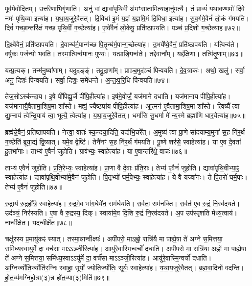 पूर्व॑मे॒वोदि॒तम्। 
उत्त॑रेणा॒भिगृ॑णाति। 
अनु॑ वां॒ द्यावा॑पृथि॒वी अ॑मꣳसाता॒मित्या॒हानु॑मत्यै। 
तं प्रा॒व्यं॑ यथा॒वण्णमो॑ दि॒वे नमः॑ पृथि॒व्या इत्या॑ह। 
य॒था॒य॒जुरे॒वैतत्। 
दि॒विधा॑ इ॒मं य॒ज्ञं य॒ज्ञमि॒मं दि॒विधा॒ इत्या॑ह। 
सु॒व॒र्गमे॒वैनं॑ लो॒कं ग॑मयति। 
दिवं॑ गच्छा॒न्तरि॑क्षं गच्छ पृथि॒वीं ग॒च्छेत्या॑ह। 
ए॒ष्वे॑वैनं॑ लो॒केषु॒ प्रति॑ष्ठापयति। 
पञ्च॑ प्र॒दिशो॑ ग॒च्छेत्या॑ह॥७२॥

दि॒क्ष्वे॑वैनं॒ प्रति॑ष्ठापयति। 
दे॒वान्घ॑र्म॒पान्ग॑च्छ पि॒तॄन्घ॑र्म॒\-पान्ग॒च्छे\-त्या॑ह। 
उ॒भये᳚ष्वे॒वैनं॒ प्रति॑ष्ठापयति। 
यत्पिन्व॑ते। 
वर्\mbox{}षु॑कः प॒र्जन्यो॑ भवति। 
तस्मा॒त्पिन्व॑मानः॒ पुण्यः॑। 
यत्प्राङ्पिन्व॑ते। 
तद्दे॒वाना᳚म्। 
यद्द॑क्षि॒णा। 
तत्पि॑तृ॒णाम्॥७३॥

यत्प्र॒त्यक्। 
तन्म॑नु॒ष्या॑णाम्। 
यदुदङ्ङ्॑। 
तद्रु॒द्राणा᳚म्। 
प्राञ्च॒मुद॑ञ्चं पिन्वयति। 
दे॒व॒त्राकः॑। 
अथो॒ खलु॑। 
सर्वा॒ अनु॒ दिशः॑ पिन्वयति। 
सर्वा॒ दिशः॒ समे॑धन्ते। 
अ॒न्तः॒प॒रि॒धि पि॑न्वयति॥७४॥

तेज॒सोऽस्क॑न्दाय। 
इ॒षे पी॑पिह्यू॒र्जे पी॑पि॒हीत्या॑ह। 
इष॑मे॒वोर्जं॒ यज॑माने दधाति। 
यज॑मानाय पीपि॒हीत्या॑ह। 
यज॑मानायै॒वैता\-मा॒शिष॒\-मा शा᳚स्ते। 
मह्यं॒ ज्यैष्ठ्या॑य पीपि॒हीत्या॑ह। 
आ॒त्मन॑ ए॒वैता\-मा॒शिष॒\-मा शा᳚स्ते। 
त्विष्यै᳚ त्वा द्यु॒म्नाय॑ त्वेन्द्रि॒याय॑ त्वा॒ भूत्यै॒ त्वेत्या॑ह। 
य॒था॒य॒जुरे॒वैतत्। 
धर्मा॑सि सु॒धर्मा मे᳚ न्य॒स्मे ब्रह्मा॑णि धार॒येत्या॑ह॥७५॥

ब्रह्म॑न्ने॒वैनं॒ प्रति॑ष्ठापयति। 
नेत्त्वा॒ वातः॑ स्क॒न्दया॒दिति॒ यद्य॑भि॒चरे᳚त्। 
अ॒मुष्य॑ त्वा प्रा॒णे सा॑दयाम्य॒मुना॑ स॒ह नि॑र॒र्थं ग॒च्छेति॑ ब्रूया॒द्यं द्वि॒ष्यात्। 
यमे॒व द्वेष्टि॑। 
तेनै॑नꣳ स॒ह नि॑र॒र्थं ग॑मयति। 
पू॒ष्णे शर॑से॒ स्वाहेत्या॑ह। 
या ए॒व दे॒वता॑ हु॒तभा॑गाः। 
ताभ्य॑ ए॒वैनं॑ जुहोति। 
ग्राव॑भ्यः॒ स्वाहेत्या॑ह। 
या ए॒वान्तरि॑क्षे॒ वाचः॑॥७६॥

ताभ्य॑ ए॒वैनं॑ जुहोति। 
प्र॒ति॒रेभ्यः॒ स्वाहेत्या॑ह। 
प्रा॒णा वै दे॒वाः प्र॑ति॒राः। 
तेभ्य॑ ए॒वैनं॑ जुहोति। 
द्यावा॑पृथि॒वीभ्या॒ꣴ॒ स्वाहेत्या॑ह। 
द्यावा॑पृथि॒वीभ्या॑मे॒वैनं॑ जुहोति। 
पि॒तृभ्यो॑ घर्म॒पेभ्यः॒ स्वाहेत्या॑ह। 
ये वै यज्वा॑नः। 
ते पि॒तरो॑ घर्म॒पाः। 
तेभ्य॑ ए॒वैनं॑ जुहोति॥७७॥

रु॒द्राय॑ रु॒द्रहो᳚त्रे॒ स्वाहेत्या॑ह। 
रु॒द्रमे॒व भा॑ग॒धेये॑न॒ सम॑र्धयति। 
स॒र्वतः॒ सम॑नक्ति। 
स॒र्वत॑ ए॒व रु॒द्रं नि॒रव॑दयते। 
उद॑ञ्चं॒ निर॑स्यति। 
ए॒षा वै रु॒द्रस्य॒ दिक्। 
स्वाया॑मे॒व दि॒शि रु॒द्रं नि॒रव॑दयते। 
अ॒प उप॑स्पृशति मेध्य॒त्वाय॑। 
नान्वी᳚क्षेत। 
यद॒न्वीक्षे॑त॥७८॥

चक्षु॑रस्य प्र॒मायु॑कꣴ स्यात्। 
तस्मा॒न्नान्वीक्ष्यः॑। 
अपी॑परो॒ माऽह्नो॒ रात्रि॑यै मा पाह्ये॒षा ते॑ अग्ने स॒मित्तया॒ समि॑ध्य॒स्वायु॑र्मे दा॒ वर्च॑सा माऽऽञ्जी॒रित्या॑ह। 
आयु॑रे॒वास्मि॒न्वर्चो॑ दधाति। 
अपी॑परो मा॒ रात्रि॑या॒ अह्नो॑ मा पाह्ये॒षा ते॑ अग्ने स॒मित्तया॒ समि॑ध्य॒स्वाऽऽयु॑र्मे दा॒ वर्च॑सा माऽऽञ्जी॒रित्या॑ह। 
आयु॑रे॒वास्मि॒न्वर्चो॑ दधाति। 
अ॒ग्निर्ज्योति॒र्ज्योति॑र॒ग्निः स्वाहा॒ सूर्यो॒ ज्योति॒र्ज्योतिः॒ सूर्यः॒ स्वाहेत्या॑ह। 
य॒था॒य॒जुरे॒वैतत्। 
ब्र॒ह्म॒वा॒दिनो॑ वदन्ति। 
हो॒त॒व्य॑मग्निहो॒त्रा(३)न्न हो॑त॒व्या(३)मिति॑॥७९॥

